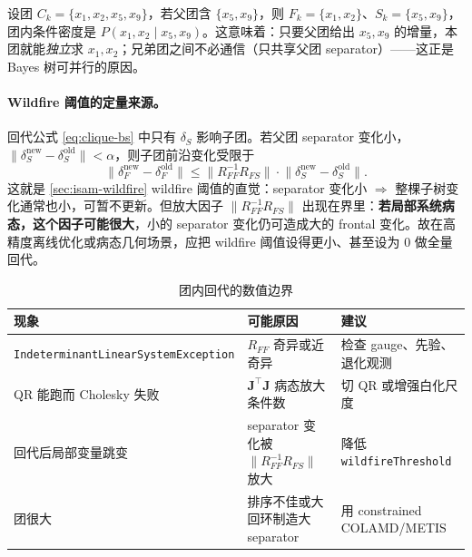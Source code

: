 设团 $C_k=\{x_1,x_2,x_5,x_9\}$，若父团含 $\{x_5,x_9\}$，则 $F_k=\{x_1,x_2\}$、$S_k=\{x_5,x_9\}$，团内条件密度是 $P(x_1,x_2\mid x_5,x_9)$。这意味着：只要父团给出 $x_5,x_9$ 的增量，本团就能\emph{独立}求 $x_1,x_2$；兄弟团之间不必通信（只共享父团 separator）——这正是 Bayes 树可并行的原因。

\paragraph{Wildfire 阈值的定量来源。}
回代公式 \cref{eq:clique-bs} 中只有 $\delta_S$ 影响子团。若父团 separator 变化小，$\|\delta_S^{\text{new}}-\delta_S^{\text{old}}\|<\alpha$，则子团前沿变化受限于
\begin{equation}
  \big\|\delta_F^{\text{new}}-\delta_F^{\text{old}}\big\|\le\big\|R_{FF}^{-1}R_{FS}\big\|\cdot\big\|\delta_S^{\text{new}}-\delta_S^{\text{old}}\big\|.
  \label{eq:wildfire-bound}
\end{equation}
这就是 \cref{sec:isam-wildfire} wildfire 阈值的直觉：separator 变化小 $\Rightarrow$ 整棵子树变化通常也小，可暂不更新。但放大因子 $\|R_{FF}^{-1}R_{FS}\|$ 出现在界里：\textbf{若局部系统病态，这个因子可能很大}，小的 separator 变化仍可造成大的 frontal 变化。故在高精度离线优化或病态几何场景，应把 wildfire 阈值设得更小、甚至设为 $0$ 做全量回代。

\begin{table}[H]\centering\small
\caption{团内回代的数值边界}
\label{tab:clique-numerical}
\begin{tabular}{lll}
\toprule
现象 & 可能原因 & 建议 \\
\midrule
\texttt{IndeterminantLinearSystemException} & $R_{FF}$ 奇异或近奇异 & 检查 gauge、先验、退化观测 \\
QR 能跑而 Cholesky 失败 & $\mathbf{J}^\top\mathbf{J}$ 病态放大条件数 & 切 QR 或增强白化尺度 \\
回代后局部变量跳变 & separator 变化被 $\|R_{FF}^{-1}R_{FS}\|$ 放大 & 降低 \texttt{wildfireThreshold} \\
团很大 & 排序不佳或大回环制造大 separator & 用 constrained COLAMD/METIS \\
\bottomrule
\end{tabular}
\end{table}

